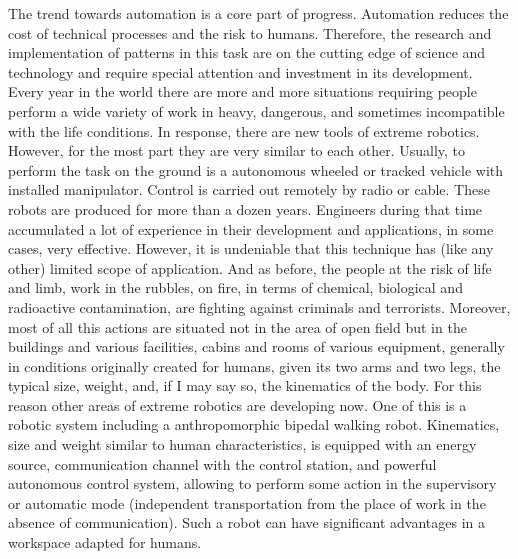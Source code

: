 \documentclass[11pt,a4paper]{article}
\begin{document}
The trend towards automation is a core part of progress. Automation reduces the cost of technical processes and the risk to humans. Therefore, the research and implementation of patterns in this task are on the cutting edge of science and technology and require special attention and investment in its development. Every year in the world there are more and more situations requiring people perform a wide variety of work in heavy, dangerous, and sometimes incompatible with the life conditions. In response, there are new tools of extreme robotics. However, for the most part they are very similar to each other. Usually, to perform the task on the ground is a autonomous wheeled or tracked vehicle with installed manipulator. Control is carried out remotely by radio or cable. These robots are produced for more than a dozen years. Engineers during that time accumulated a lot of experience in their development and applications, in some cases, very effective. However, it is undeniable that this technique has (like any other) limited scope of application. And as before, the people at the risk of life and limb, work in the rubbles, on fire, in terms of chemical, biological and radioactive contamination, are fighting against criminals and terrorists. Moreover, most of all this actions are situated not in the area of open field but in the buildings and various facilities, cabins and rooms of various equipment,  generally in conditions originally created for humans, given its two arms and two legs, the typical size, weight, and, if I may say so, the kinematics of the body. For this reason other areas of extreme robotics are developing now. One of this is a robotic system including a anthropomorphic bipedal walking robot. Kinematics, size and weight  similar to human characteristics, is equipped with an energy source, communication channel with the control station, and powerful autonomous control system, allowing to perform some action in the supervisory or automatic mode (independent transportation from the place of work in the absence of communication). Such a robot can have significant advantages in a workspace adapted for humans.
\end{document}

